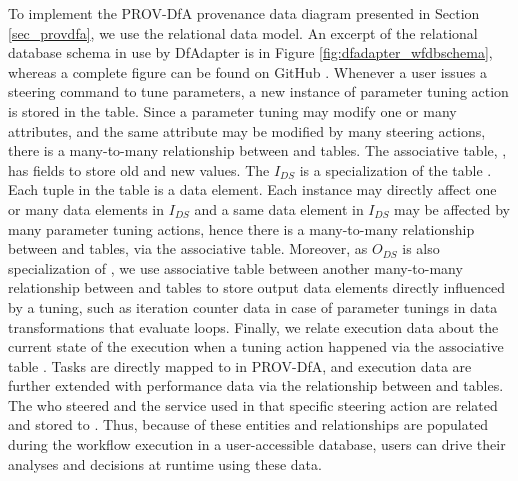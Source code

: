 To implement the PROV-DfA provenance data diagram presented in Section \ref{sec_provdfa}, we use the relational data model.
An excerpt of the relational database schema in use by DfAdapter is in Figure \ref{fig:dfadapter_wfdbschema}, whereas a complete figure can be found
on GitHub \cite{DfAdapterGitHubDfAdapter}.
Whenever a user issues a steering command to tune parameters, a new
instance of parameter tuning action is stored in the 
table. Since a parameter tuning may modify one or many attributes, and
the same attribute may be modified by many steering actions, there is a
many-to-many relationship between  and  tables.
The associative table, , has fields to store old and new
values. The $I_{DS}$ is a specialization of the table .
Each tuple in the  table is a data element.
Each 
instance may directly affect one or many data elements in
$I_{DS}$ and a same data element in $I_{DS}$ may be
affected by many parameter tuning actions, hence there is a many-to-many
relationship between  and  tables, via the
 associative table.
Moreover, as
$O_{DS}$ is also specialization of , we use
 associative table between another many-to-many
relationship between  and  tables to store output
data elements directly influenced by a tuning, such as iteration counter
data in case of parameter tunings in data transformations that evaluate
loops. Finally, we relate execution data about the current state of the
execution when a tuning action happened via the associative table
.
Tasks are directly mapped to 
in PROV-DfA, and execution data are further extended with
performance data via the relationship between  and 
tables. The  who steered and the  service used in that
specific steering action are related and stored to . Thus, because
of these entities and relationships are populated during the workflow execution in a user-accessible database, users can drive their
analyses and decisions at runtime using these data.

